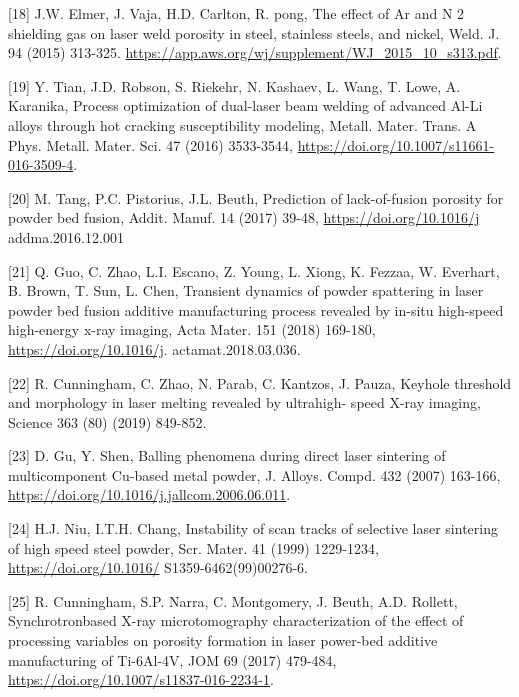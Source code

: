 \documentclass[10pt]{article}
\begin{document}
[18] J.W. Elmer, J. Vaja, H.D. Carlton, R. pong, The effect of Ar and N 2 shielding gas on laser weld porosity in steel, stainless steels, and nickel, Weld. J. 94 (2015) 313-325. \href{https://app.aws.org/wj/supplement/WJ_2015_10_s313.pdf}{https://app.aws.org/wj/supplement/WJ\_2015\_10\_s313.pdf}.

[19] Y. Tian, J.D. Robson, S. Riekehr, N. Kashaev, L. Wang, T. Lowe, A. Karanika, Process optimization of dual-laser beam welding of advanced Al-Li alloys through hot cracking susceptibility modeling, Metall. Mater. Trans. A Phys. Metall. Mater. Sci. 47 (2016) 3533-3544, \href{https://doi.org/10.1007/s11661-016-3509-4}{https://doi.org/10.1007/s11661-016-3509-4}.

[20] M. Tang, P.C. Pistorius, J.L. Beuth, Prediction of lack-of-fusion porosity for powder bed fusion, Addit. Manuf. 14 (2017) 39-48, \href{https://doi.org/10.1016/j}{https://doi.org/10.1016/j} addma.2016.12.001

[21] Q. Guo, C. Zhao, L.I. Escano, Z. Young, L. Xiong, K. Fezzaa, W. Everhart, B. Brown, T. Sun, L. Chen, Transient dynamics of powder spattering in laser powder bed fusion additive manufacturing process revealed by in-situ high-speed high-energy x-ray imaging, Acta Mater. 151 (2018) 169-180, \href{https://doi.org/10.1016/j}{https://doi.org/10.1016/j}. actamat.2018.03.036.

[22] R. Cunningham, C. Zhao, N. Parab, C. Kantzos, J. Pauza, Keyhole threshold and morphology in laser melting revealed by ultrahigh- speed X-ray imaging, Science 363 (80) (2019) 849-852.

[23] D. Gu, Y. Shen, Balling phenomena during direct laser sintering of multicomponent Cu-based metal powder, J. Alloys. Compd. 432 (2007) 163-166, \href{https://doi.org/10.1016/j.jallcom.2006.06.011}{https://doi.org/10.1016/j.jallcom.2006.06.011}.

[24] H.J. Niu, I.T.H. Chang, Instability of scan tracks of selective laser sintering of high speed steel powder, Scr. Mater. 41 (1999) 1229-1234, \href{https://doi.org/10.1016/}{https://doi.org/10.1016/} S1359-6462(99)00276-6.

[25] R. Cunningham, S.P. Narra, C. Montgomery, J. Beuth, A.D. Rollett, Synchrotronbased X-ray microtomography characterization of the effect of processing variables on porosity formation in laser power-bed additive manufacturing of Ti-6Al-4V, JOM 69 (2017) 479-484, \href{https://doi.org/10.1007/s11837-016-2234-1}{https://doi.org/10.1007/s11837-016-2234-1}.
\end{document}
